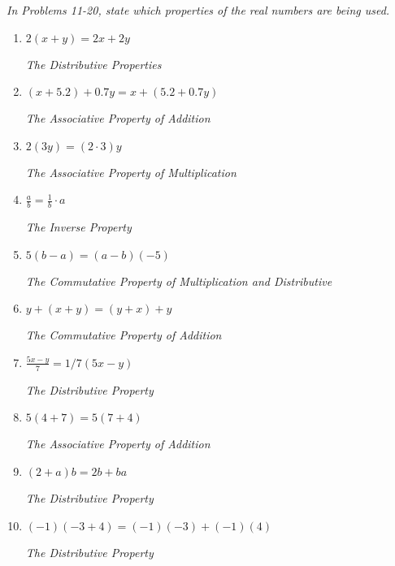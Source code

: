 \documentclass{article}
\begin{document}
\textit{In Problems 11-20, state which properties of the real numbers are being used.}
\begin{enumerate}[start=11]
    \item $2(x+y) = 2x + 2y$\par
    \textit{The Distributive Properties}

    \item $(x + 5.2) + 0.7y = x + (5.2 + 0.7y)$\par
    \textit{The Associative Property of Addition}
    
    \item $2(3y) = (2 \cdot 3)y$\par
    \textit{The Associative Property of Multiplication}    

    \item $\frac{a}{b} = \frac{1}{b} \cdot a$\par
    \textit{The Inverse Property}
    
    \item $5(b - a) = (a - b)(-5)$\par
    \textit{The Commutative Property of Multiplication and Distributive}
    
    \item $y + (x + y) = (y + x) + y$\par
    \textit{The Commutative Property of Addition}
    
    \item $\frac{5x - y}{7} = 1/7(5x - y)$\par
    \textit{The Distributive Property}
    
    \item $5(4 + 7) = 5(7 + 4)$\par
    \textit{The Associative Property of Addition}
    
    \item $(2 + a)b = 2b + ba$\par
    \textit{The Distributive Property}
    
    \item $(-1)(-3 + 4) = (-1)(-3) + (-1)(4)$\par
    \textit{The Distributive Property}
\end{enumerate}
\end{document}
